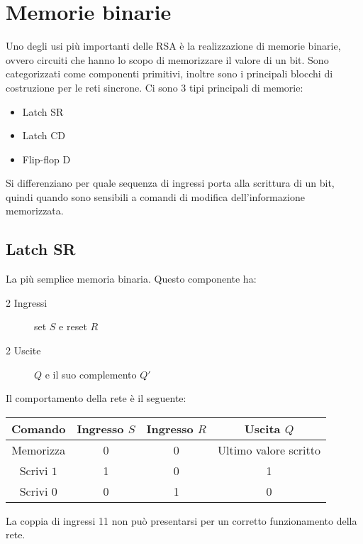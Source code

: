 \documentclass{subfiles}
\begin{document}
\section{Memorie binarie}

Uno degli usi più importanti delle RSA è la realizzazione di memorie binarie, ovvero circuiti che hanno lo scopo di memorizzare il valore di un bit.
Sono categorizzati come componenti primitivi, inoltre sono i principali blocchi di costruzione per le reti sincrone.
Ci sono 3 tipi principali di memorie:

\begin{itemize}
    \item Latch SR
    \item Latch CD
    \item Flip-flop D
\end{itemize}

\noindent
Si differenziano per quale sequenza di ingressi porta alla scrittura di un bit, quindi quando sono sensibili a comandi di modifica dell’informazione memorizzata.

\subsection{Latch SR}

La più semplice memoria binaria.
Questo componente ha:

\begin{description}
    \item[2 Ingressi] set $S$ e reset $R$
    \item[2 Uscite] $Q$ e il suo complemento $Q'$
\end{description}

\noindent
Il comportamento della rete è il seguente:

\begin{center}
\begin{tabular}{ |c|c|c|c| }
\hline
Comando & Ingresso $S$ & Ingresso $R$ & Uscita $Q$  \\
\hline
\hline
Memorizza & 0 & 0 & Ultimo valore scritto \\
Scrivi $1$ & 1 & 0 & 1 \\
Scrivi $0$ & 0 & 1 & 0 \\
\hline
\end{tabular}
\end{center}

\noindent
La coppia di ingressi 11 non può presentarsi per un corretto funzionamento della rete.
\end{document}
